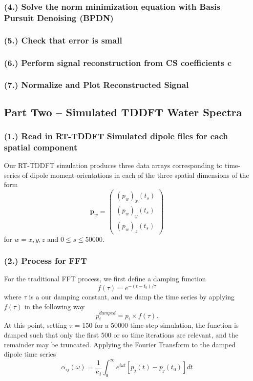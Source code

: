 \documentclass[11pt]{article}
\begin{document}
\subsubsection*{(4.)	Solve the norm minimization equation with Basis Pursuit Denoising (BPDN)}
\subsubsection*{(5.)	Check that error is small}
\subsubsection*{(6.)	Perform signal reconstruction from CS coefficients $\mathbf{c}$}
\subsubsection*{(7.)	Normalize and Plot Reconstructed Signal} 

\subsection*{Part Two -- Simulated TDDFT Water Spectra}

\subsubsection*{(1.)	Read in RT-TDDFT Simulated dipole files for each spatial component}
Our RT-TDDFT simulation produces three data arrays corresponding to time-series of dipole moment orientations in each of the three spatial dimensions of the form
$$\mathbf{p}_{w}= \begin{pmatrix} (p_{w})_{x}(t_{s})\\  (p_{w})_{y}(t_{s}) \\  (p_{w})_{z}(t_{s})\end{pmatrix}$$
for $w = x, y, z$ and $0 \leq s \leq 50000$.

\subsubsection*{(2.)	Process for FFT}
For the traditional FFT process, we first define a damping function 
$$f(\tau) = e^{-(t - t_{0}) / \tau}$$
where $\tau$ is a our damping constant, and we damp the time series by applying $f(\tau)$ in the following way
$$p_{i}^{damped} = p_{i} \times f(\tau).$$
At this point, setting $\tau$ = 150 for a 50000 time-step simulation, the function is damped such that only the first 500 or so time iterations are relevant, and the remainder may be truncated.  Applying the Fourier Transform to the damped dipole time series 
$$\alpha_{ij}(\omega) = \frac{1}{\kappa_{i}}\int_{0}^{\infty}  e^{i\omega t} [p_{j}(t) - p_{j}(t_{0})] dt$$ 
\end{document}
